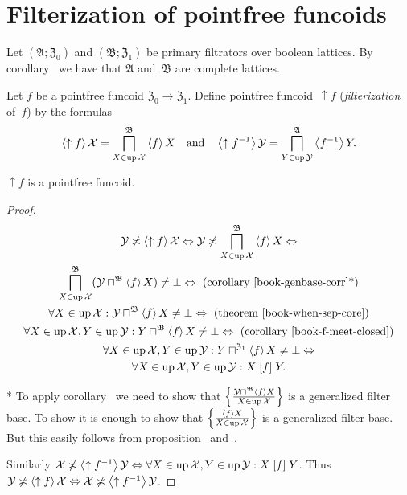 \chapter{Filterization of pointfree funcoids}

Let $(\mathfrak{A};\mathfrak{Z}_0)$ and $(\mathfrak{B};\mathfrak{Z}_1)$ be primary filtrators over boolean lattices.
By corollary~ we have that $\mathfrak{A}$ and~$\mathfrak{B}$ are complete lattices.

Let $f$ be a pointfree funcoid $\mathfrak{Z}_0\rightarrow\mathfrak{Z}_1$. Define pointfree funcoid~$\uparrow f$ (\emph{filterization} of~$f$)
by the formulas
\[
\left\langle \uparrow f\right\rangle \mathcal{X} = \bigsqcap^{\mathfrak{B}}_{X\in\operatorname{up}\mathcal{X}} \left\langle f\right\rangle X \quad\text{and}\quad
\left\langle \uparrow f^{-1}\right\rangle \mathcal{Y} = \bigsqcap^{\mathfrak{A}}_{Y\in\operatorname{up}\mathcal{Y}} \left\langle f^{-1}\right\rangle Y.
\]

\begin{prop}
$\uparrow f$ is a pointfree funcoid.
\end{prop}

\begin{proof}
~
\begin{multline*}
\mathcal{Y} \nasymp \supfun{\uparrow f} \mathcal{X} \Leftrightarrow
\mathcal{Y} \nasymp \bigsqcap^{\mathfrak{B}}_{X\in\up\mathcal{X}} \supfun{f}X \Leftrightarrow \\
\bigsqcap^{\mathfrak{B}}_{X\in\up\mathcal{X}} (\mathcal{Y} \sqcap^{\mathfrak{B}} \supfun{f}X) \ne \bot \Leftrightarrow \text{ (corollary~\bookref{genbase-corr}*)} \\
\forall X\in\up\mathcal{X}: \mathcal{Y} \sqcap^{\mathfrak{B}} \supfun{f}X \ne \bot \Leftrightarrow \text{ (theorem \bookref{when-sep-core})} \\
\forall X\in\up\mathcal{X}, Y\in\up\mathcal{Y}: Y \sqcap^{\mathfrak{B}} \supfun{f}X \ne \bot \Leftrightarrow \text{ (corollary \bookref{f-meet-closed})} \\
\forall X\in\up\mathcal{X}, Y\in\up\mathcal{Y}: Y \sqcap^{\mathfrak{Z}_1} \supfun{f}X \ne \bot \Leftrightarrow \\
\forall X\in\up\mathcal{X}, Y\in\up\mathcal{Y}: X\suprel{f}Y.
\end{multline*}

* To apply corollary~ we need to show that
$\left\{ \frac{\mathcal{Y} \sqcap^{\mathfrak{B}} \left\langle f\right\rangle X}{X\in\operatorname{up}\mathcal{X}}\right\}$ is a generalized filter base.
To show it is enough to show that $\left\{ \frac{\left\langle f\right\rangle X}{X\in\operatorname{up}\mathcal{X}}\right\}$ is a generalized filter base.
But this easily follows from proposition~ and~.

Similarly $\mathcal{X} \not\asymp \left\langle \uparrow f^{-1}\right\rangle \mathcal{Y} \Leftrightarrow
\forall X\in\operatorname{up}\mathcal{X}, Y\in\operatorname{up}\mathcal{Y}: X\mathrel{\left[f\right]}Y$.
Thus $\mathcal{Y} \not\asymp \left\langle \uparrow f\right\rangle \mathcal{X} \Leftrightarrow \mathcal{X} \not\asymp \left\langle \uparrow f^{-1}\right\rangle \mathcal{Y}$.
\end{proof}


